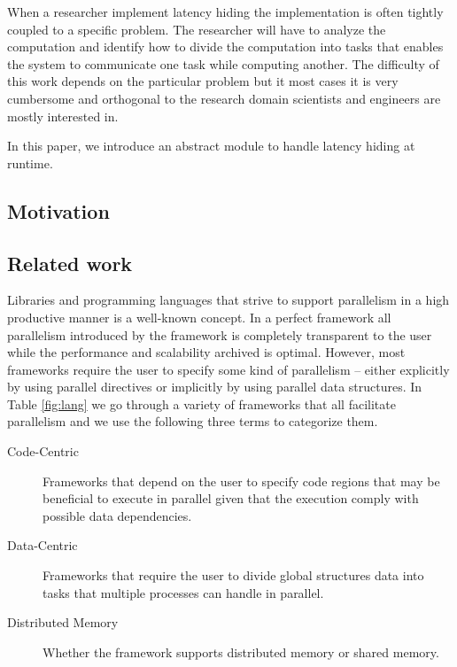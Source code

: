 \documentclass[preprint]{../PGAS10/sigplanconf}
\begin{document}
When a researcher implement latency hiding the implementation is often tightly coupled to a specific problem. The researcher will have to analyze the computation and identify how to divide the computation into tasks that enables the system to communicate one task while computing another. The difficulty of this work depends on the particular problem but it most cases it is very cumbersome and orthogonal to the research domain scientists and engineers are mostly interested in.

In this paper, we introduce an abstract module to handle latency hiding at runtime.



\subsection{Motivation}
\subsection{Related work}
Libraries and programming languages that strive to support parallelism in a high productive manner is a well-known concept. In a perfect framework all parallelism introduced by the framework is completely transparent to the user while the performance and scalability archived is optimal. However, most frameworks require the user to specify some kind of parallelism -- either explicitly by using parallel directives or implicitly by using parallel data structures. In Table \ref{fig:lang} we go through a variety of frameworks that all facilitate parallelism and we use the following three terms to categorize them.
\begin{description}
\item[Code-Centric] Frameworks that depend on the user to specify code regions that may be beneficial to execute in parallel given that the execution comply with possible data dependencies.
\item[Data-Centric] Frameworks that require the user to divide global structures data into tasks that multiple processes can handle in parallel.
\item[Distributed Memory] Whether the framework supports distributed memory or shared memory.
\end{description}
\end{document}
